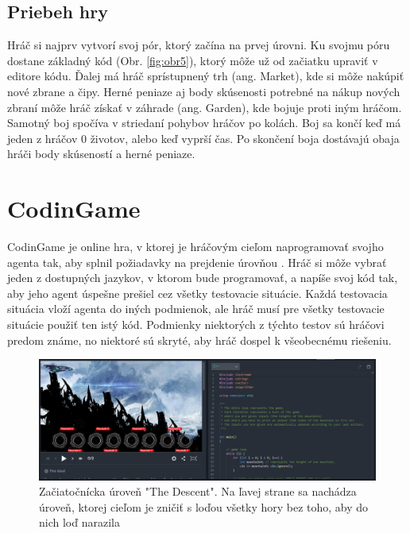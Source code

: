 \documentclass[slovak,a4paper,10pt]{article}
\begin{document}
\subsection{Priebeh hry}
Hráč si najprv vytvorí svoj pór, ktorý začína na prvej úrovni. Ku svojmu póru dostane základný kód (Obr. \ref{fig:obr5}), ktorý môže už od začiatku upraviť v editore kódu. Ďalej má hráč sprístupnený trh (ang. Market), kde si môže nakúpiť nové zbrane a čipy. Herné peniaze aj body skúsenosti potrebné na nákup nových zbraní môže hráč získať v záhrade (ang. Garden), kde bojuje proti iným hráčom. \\
Samotný boj spočíva v striedaní pohybov hráčov po kolách. Boj sa končí keď má jeden z hráčov 0 životov, alebo keď vyprší čas. Po skončení boja dostávajú obaja hráči body skúseností a herné peniaze.

\section{CodinGame}
CodinGame je online hra, v ktorej je hráčovým cieľom naprogramovať svojho agenta tak, aby splnil požiadavky na prejdenie úrovňou \cite{combefis2016learning}. Hráč si môže vybrať jeden z dostupných jazykov, v ktorom bude programovať, a napíše svoj kód tak, aby jeho agent úspešne prešiel cez všetky testovacie situácie. Každá testovacia situácia vloží agenta do iných podmienok, ale hráč musí pre všetky testovacie situácie použiť ten istý kód. Podmienky niektorých z týchto testov sú hráčovi predom známe, no niektoré sú skryté, aby hráč dospel k všeobecnému riešeniu.\\
\begin{figure}[h]
\includegraphics[scale=0.28]{codingamemain}
\centering
\caption{Začiatočnícka úroveň "The Descent". Na ľavej strane sa nachádza úroveň, ktorej cieľom je zničiť s loďou všetky hory bez toho, aby do nich loď narazila}
\label{fig:obr6}
\end{figure}
\end{document}
